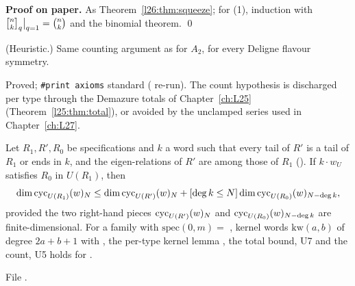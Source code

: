\textbf{Proof on paper.} As Theorem~\ref{l26:thm:squeeze}; for (1), induction with $\ltwentysixqb nk\big|_{q=1}=\binom nk$ and
the binomial theorem. \qed

\begin{physics}
(Heuristic.) Same counting argument as for $A_2$, for every Deligne flavour symmetry.
\end{physics}

\begin{status}
Proved; \texttt{\#print axioms} standard ( re-run). The count hypothesis is discharged per type through the
Demazure totals of Chapter~\ref{ch:L25} (Theorem~\ref{l25:thm:total}), or avoided by the unclamped series used in
Chapter~\ref{ch:L27}.
\end{status}

\begin{theorem}\label{l26:thm:kernelstep}
Let $R_1,R',R_0$ be specifications and $k$ a word such that every tail of $R'$ is a tail of $R_1$ or ends in $k$, and the
eigen-relations of $R'$ are among those of $R_1$ (). If $k\cdot w_U$ satisfies $R_0$ in $U(R_1)$, then
\begin{equation*}
\dim\operatorname{cyc}_{U(R_1)}(w)_N\le\dim\operatorname{cyc}_{U(R')}(w)_N+[\deg k\le N]\dim\operatorname{cyc}_{U(R_0)}(w)_{N-\deg k},
\end{equation*}
provided the two right-hand pieces $\operatorname{cyc}_{U(R')}(w)_N$ and $\operatorname{cyc}_{U(R_0)}(w)_{N-\deg k}$ are finite-dimensional.
For a family  with $\mathrm{spec}(0,m)=$ , kernel words $\mathrm{kw}(a,b)$ of degree $2a+b+1$ with
, the per-type kernel lemma , the total bound, U7 and
the count, U5 holds for .
\end{theorem}
\noindent File .
